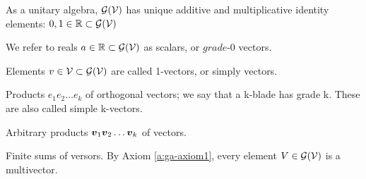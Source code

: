 \begin{definition}
    As a unitary algebra, $\mathcal{G}(\mathcal{V})$ has unique additive and multiplicative identity elements: $0, 1 \in \mathbb{R} \subset \mathcal{G}(\mathcal{V})$
\end{definition}
\begin{definition}[Scalars]
    We refer to reals $a \in \mathbb{R} \subset \mathcal{G}(\mathcal{V})$ as scalars, or $\textit{grade-0}$ vectors.
\end{definition}
\begin{definition}[1-vectors]
    Elements $v \in \mathcal{V} \subset \mathcal{G}(\mathcal{V})$ are called 1-vectors, or simply vectors.
\end{definition}
\begin{definition}[k-blades] \label{d:k-blades}
Products $e_1e_2 \ldots e_k$ of orthogonal vectors; we say that a k-blade has grade k. These are also called simple k-vectors.
\end{definition}
\begin{definition}[Versors]
Arbitrary products $\boldsymbol{v}_1\boldsymbol{v}_2 \ldots \boldsymbol{v}_k$ of vectors.
\end{definition}
\begin{definition}[Multivectors]
	Finite sums of versors. By Axiom \ref{a:ga-axiom1}, every element $V \in \mathcal{G}(\mathcal{V})$ is a multivector.
\end{definition}
